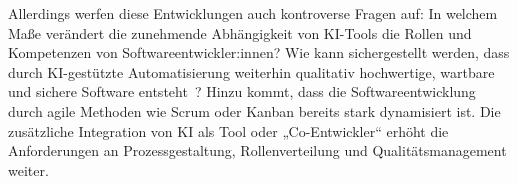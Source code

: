 Allerdings werfen diese Entwicklungen auch kontroverse Fragen auf: In welchem
Maße verändert die zunehmende Abhängigkeit von KI-Tools die Rollen und
Kompetenzen von Softwareentwickler:innen? Wie kann sichergestellt werden, dass
durch KI-gestützte Automatisierung weiterhin qualitativ hochwertige, wartbare
und sichere Software entsteht~\cite{siebert_generative_2024}? Hinzu kommt, dass
die Softwareentwicklung durch agile Methoden wie Scrum oder Kanban bereits
stark dynamisiert ist. Die zusätzliche Integration von KI als Tool oder
„Co-Entwickler“ erhöht die Anforderungen an Prozessgestaltung, Rollenverteilung
und Qualitätsmanagement weiter.

